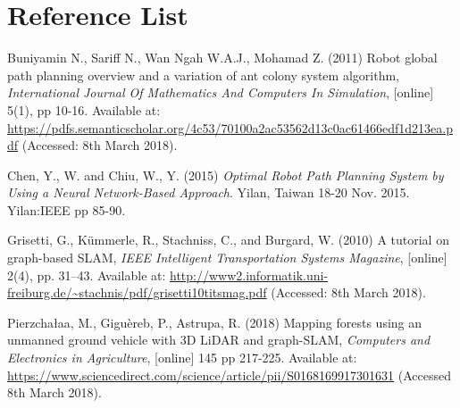 \documentclass[a4paper, 12pt]{article}
\begin{document}
\newpage
\section{Reference List}


Buniyamin N., Sariff N., Wan Ngah W.A.J., Mohamad Z. (2011) Robot global path planning overview and a variation of ant colony system algorithm, \textit{International Journal Of Mathematics And Computers In Simulation}, [online] 5(1), pp 10-16. Available at: \url{https://pdfs.semanticscholar.org/4c53/70100a2ac53562d13c0ac61466edf1d213ea.pdf} (Accessed: 8th March 2018).   

Chen, Y., W. and Chiu, W., Y. (2015) \textit{Optimal Robot Path Planning System by Using a Neural Network-Based Approach}. Yilan, Taiwan 18-20 Nov. 2015. Yilan:IEEE pp 85-90.

Grisetti, G., Kümmerle, R., Stachniss, C., and Burgard, W. (2010) A tutorial
on graph-based SLAM, \textit{IEEE Intelligent Transportation Systems Magazine}, [online] 2(4), pp. 31–43. Available at: \url{http://www2.informatik.uni-freiburg.de/~stachnis/pdf/grisetti10titsmag.pdf} (Accessed: 8th March 2018).

Pierzchałaa, M., Giguèreb, P., Astrupa, R. (2018) Mapping forests using an unmanned ground vehicle with 3D LiDAR and graph-SLAM, \textit{Computers and Electronics in Agriculture}, [online] 145 pp 217-225. Available at: \url{https://www.sciencedirect.com/science/article/pii/S0168169917301631} (Accessed 8th March 2018).
\end{document}
